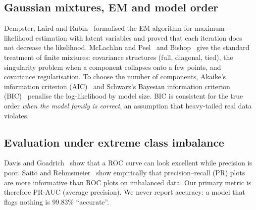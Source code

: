 \documentclass[12pt]{article}
\begin{document}
\subsection{Gaussian mixtures, EM and model order}
Dempster, Laird and Rubin~\cite{dempster1977} formalised the EM algorithm for maximum-likelihood estimation with
latent variables and proved that each iteration does not decrease the likelihood. McLachlan and Peel~\cite{mclachlan2000}
and Bishop~\cite{bishop2006} give the standard treatment of finite mixtures: covariance structures (full, diagonal,
tied), the singularity problem when a component collapses onto a few points, and covariance regularisation. To choose
the number of components, Akaike's information criterion (AIC)~\cite{akaike1974} and Schwarz's Bayesian information
criterion (BIC)~\cite{schwarz1978} penalise the log-likelihood by model size. BIC is consistent for the true order
\emph{when the model family is correct}, an assumption that heavy-tailed real data violates.

\subsection{Evaluation under extreme class imbalance}
Davis and Goadrich~\cite{davis2006} show that a ROC curve can look excellent while precision is poor. Saito and
Rehmsmeier~\cite{saito2015} show empirically that precision--recall (PR) plots are more informative than ROC plots on
imbalanced data. Our primary metric is therefore PR-AUC (average precision). We never report accuracy: a model that
flags nothing is 99.83\% ``accurate''.
\end{document}
